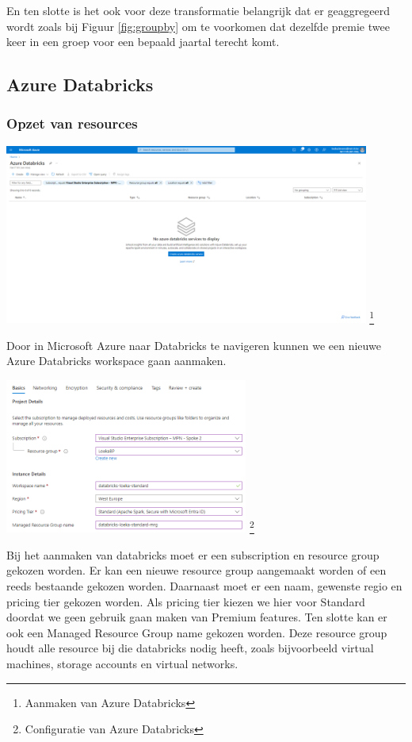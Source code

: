 En ten slotte is het ook voor deze transformatie belangrijk dat er geaggregeerd wordt zoals bij Figuur \ref{fig:groupby} om te voorkomen dat dezelfde premie twee keer in een groep voor een bepaald jaartal terecht komt.

\subsection{Azure Databricks}

\subsubsection{Opzet van resources}

\begin{center}
    \includegraphics[width=0.9\textwidth]{./graphics/databricks/initial_1.png}
    \footnote{Aanmaken van Azure Databricks}
\end{center}

Door in Microsoft Azure naar Databricks te navigeren kunnen we een nieuwe Azure Databricks workspace gaan aanmaken.

\begin{center}
    \includegraphics[width=0.6\textwidth]{./graphics/databricks/initial_2.png}
    \footnote{Configuratie van Azure Databricks}
\end{center}

Bij het aanmaken van databricks moet er een subscription en resource group gekozen worden. Er kan een nieuwe resource group aangemaakt worden of een reeds bestaande gekozen worden. Daarnaast moet er een naam, gewenste regio en pricing tier gekozen worden. Als pricing tier kiezen we hier voor Standard doordat we geen gebruik gaan maken van Premium features. Ten slotte kan er ook een Managed Resource Group name gekozen worden. Deze resource group houdt alle resource bij die databricks nodig heeft, zoals bijvoorbeeld virtual machines, storage accounts en virtual networks.


